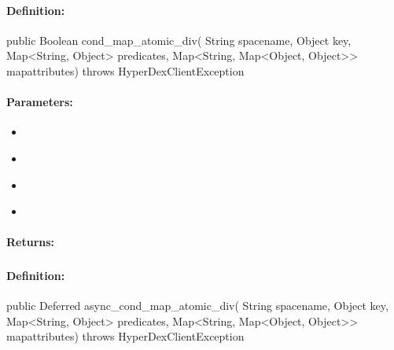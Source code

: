 \paragraph{Definition:}
\begin{javacode}
public Boolean cond_map_atomic_div(
        String spacename,
        Object key,
        Map<String, Object> predicates,
        Map<String, Map<Object, Object>> mapattributes) throws HyperDexClientException
\end{javacode}

\paragraph{Parameters:}
\begin{itemize}[noitemsep]
\item {}\\

\item {}\\

\item {}\\

\item {}\\

\end{itemize}

\paragraph{Returns:}


\pagebreak
\subsubsection{}
\label{api:java:async_cond_map_atomic_div}


\paragraph{Definition:}
\begin{javacode}
public Deferred async_cond_map_atomic_div(
        String spacename,
        Object key,
        Map<String, Object> predicates,
        Map<String, Map<Object, Object>> mapattributes) throws HyperDexClientException
\end{javacode}

